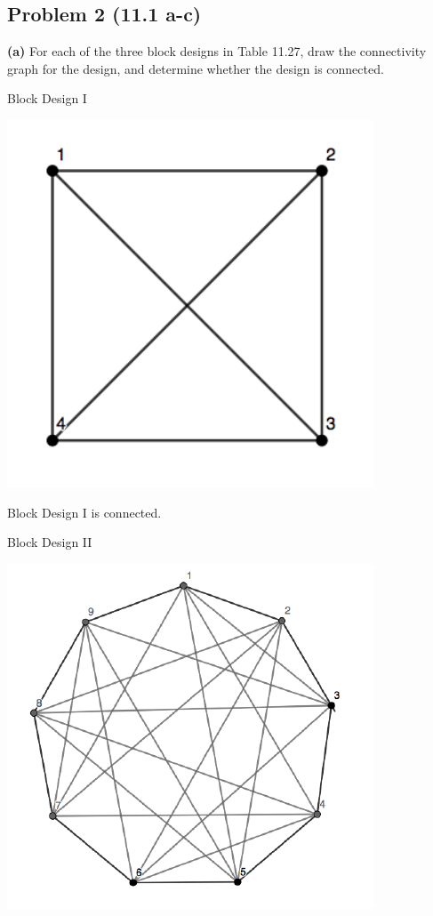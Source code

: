 \documentclass[12pt,]{article}
\begin{document}
\subsection{Problem 2 (11.1 a-c)}\label{problem-2-11.1-a-c}

\textbf{(a)} For each of the three block designs in Table 11.27, draw
the connectivity graph for the design, and determine whether the design
is connected.

\begin{center}
Block Design I
\end{center}

\begin{center}\includegraphics{Markdown_HW_8_files/figure-latex/unnamed-chunk-7-1} \end{center}

Block Design I is connected.

\begin{center}
Block Design II
\end{center}

\begin{center}\includegraphics{Markdown_HW_8_files/figure-latex/unnamed-chunk-8-1} \end{center}
\end{document}
